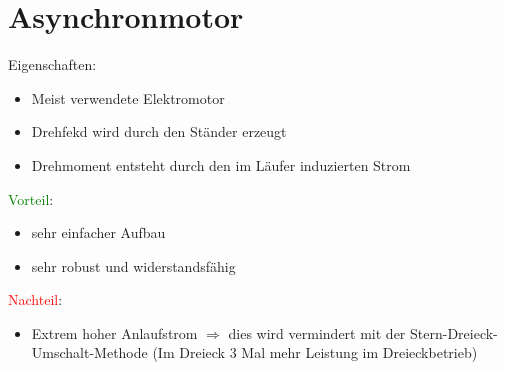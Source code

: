 \section{Asynchronmotor}
Eigenschaften:
\begin{itemize}
    \item Meist verwendete Elektromotor
    \item Drehfekd wird durch den Ständer erzeugt
    \item Drehmoment entsteht durch den im Läufer induzierten Strom
\end{itemize}
\textcolor{green}{Vorteil}:
\begin{itemize}
	\item sehr einfacher Aufbau
	\item sehr robust und widerstandsfähig 
\end{itemize}
\textcolor{red}{Nachteil}:
\begin{itemize}
	\item Extrem hoher Anlaufstrom \newline
		$\Rightarrow$ dies wird vermindert mit der Stern-Dreieck-Umschalt-Methode \newline
        (Im Dreieck 3 Mal mehr Leistung im Dreieckbetrieb)
\end{itemize}

